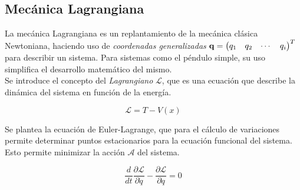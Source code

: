 \subsection{Mecánica Lagrangiana}

La mecánica Lagrangiana es un replantamiento de la 
mecánica clásica Newtoniana, haciendo uso
de \emph{coordenadas generalizadas}
$\bold{q} = 
\begin{pmatrix}
q_1 & q_2 &\cdots & q_i
\end{pmatrix}^T
$ para describir un sistema.
Para sistemas como el péndulo simple, su uso simplifica el
desarrollo matemático del mismo.\\

Se introduce el concepto del \emph{Lagrangiano} $\mathcal{L}$,
que es una ecuación que describe la dinámica del sistema en 
función de la energía.

\begin{equation}
 \mathcal{L} = T - V(x)
 \label{eq: lagrangian}
\end{equation}

Se plantea la ecuación de Euler-Lagrange, 
que para el cálculo de variaciones permite determinar
puntos estacionarios para la ecuación funcional del sistema.
Esto permite minimizar la acción $\mathcal{A}$ del sistema.

\begin{equation}
 \dfrac{d}{dt} \dfrac{\partial \mathcal{L}}{\partial \dot{q}} - 
 \dfrac{\partial \mathcal{L}}{\partial q} = 0
 \label{eq: euler lagrange equation}
\end{equation}




